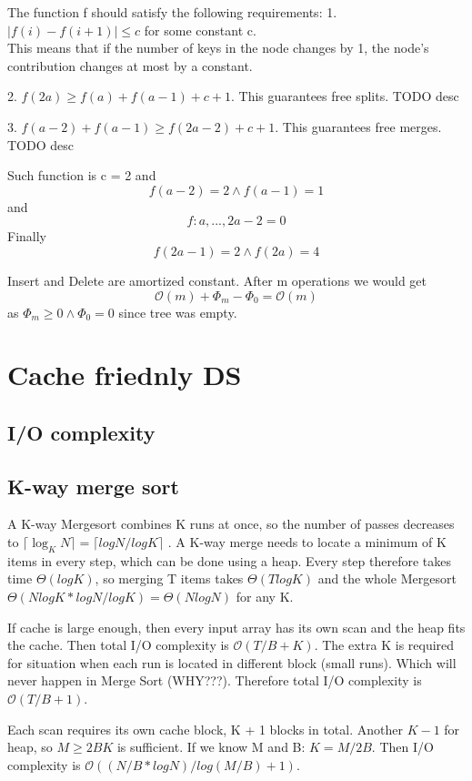 \documentclass[12pt]{article}
\newcommand{\bigO}{\mathcal{O}}
\begin{document}
The function f should satisfy the following requirements:
1. $|f (i) - f (i + 1)| \leq c$ for some constant c. \\

This means that if the number of keys in the node changes by 1, the node’s contribution changes at most by a constant.

2. $f(2a) \geq f(a) + f(a - 1) + c + 1$.
This guarantees free splits. TODO desc

3. $f(a - 2) + f(a - 1) \geq f(2a - 2) + c + 1$.
This guarantees free merges. TODO desc

Such function is c = 2 and
\[ f(a-2) = 2 \land f(a-1) = 1 \]
and
\[ f:{a, ..., 2a-2} = 0 \]
Finally
\[ f(2a-1) = 2 \land f(2a) = 4 \]

Insert and Delete are amortized constant. After m operations we would get
\[ \bigO(m) + \Phi_m - \Phi_0 = \bigO(m) \]
as $ \Phi_m \geq 0 \land \Phi_0 = 0 $ since tree was empty.

\section{Cache friednly DS}
\subsection{I/O complexity}
\subsection{K-way merge sort}
A K-way Mergesort combines K runs at once, so the number of passes decreases to $ \lceil \log_K N \rceil = \lceil log N/log K \rceil$ .
A K-way merge needs to locate a minimum of K items in every step, which can be done using a heap.
Every step therefore takes time $ \Theta(log K)$, so merging T items takes $\Theta(T log K) $ and the whole Mergesort $ \Theta(N log K * log N/ log K) = \Theta(N log N )$ for any K.

If cache is large enough, then every input array has its own scan and the heap fits the cache. Then total I/O complexity is $ \bigO(T/B + K)$. The extra K is required for situation when each run is located in different block (small runs). Which will never happen in Merge Sort (WHY???). Therefore total I/O complexity is $ \bigO(T/B + 1)$.

Each scan requires its own cache block, K + 1 blocks in total. Another  $K - 1$ for heap, so $M \geq 2BK$ is sufficient.
If we know M and B: $K = M/2B$. Then I/O complexity is $\bigO((N/B * log N)/log(M/B)+1)$.
\end{document}
